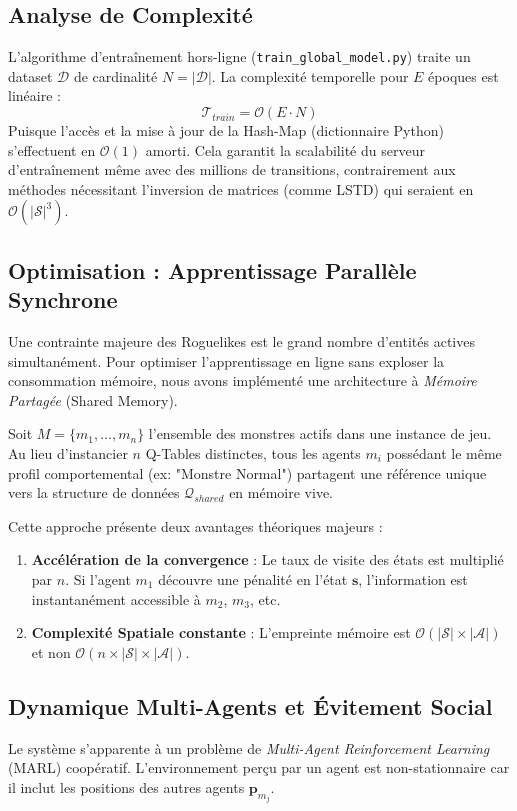 \documentclass[12pt,a4paper]{article}
\newcommand{\state}{\mathbf{s}}
\begin{document}
\subsection{Analyse de Complexité}
L'algorithme d'entraînement hors-ligne (\texttt{train\_global\_model.py}) traite un dataset $\mathcal{D}$ de cardinalité $N = |\mathcal{D}|$.
La complexité temporelle pour $E$ époques est linéaire :
\begin{equation}
    \mathcal{T}_{train} = \mathcal{O}(E \cdot N)
\end{equation}
Puisque l'accès et la mise à jour de la Hash-Map (dictionnaire Python) s'effectuent en $\mathcal{O}(1)$ amorti. Cela garantit la scalabilité du serveur d'entraînement même avec des millions de transitions, contrairement aux méthodes nécessitant l'inversion de matrices (comme LSTD) qui seraient en $\mathcal{O}(|\mathcal{S}|^3)$.

\subsection{Optimisation : Apprentissage Parallèle Synchrone}
Une contrainte majeure des Roguelikes est le grand nombre d'entités actives simultanément. Pour optimiser l'apprentissage en ligne sans exploser la consommation mémoire, nous avons implémenté une architecture à \textit{Mémoire Partagée} (Shared Memory).

Soit $M = \{m_1, \dots, m_n\}$ l'ensemble des monstres actifs dans une instance de jeu. Au lieu d'instancier $n$ Q-Tables distinctes, tous les agents $m_i$ possédant le même profil comportemental (ex: "Monstre Normal") partagent une référence unique vers la structure de données $\mathcal{Q}_{shared}$ en mémoire vive.

Cette approche présente deux avantages théoriques majeurs :
\begin{enumerate}
    \item \textbf{Accélération de la convergence} : Le taux de visite des états est multiplié par $n$. Si l'agent $m_1$ découvre une pénalité en l'état $\state$, l'information est instantanément accessible à $m_2$, $m_3$, etc.
    \item \textbf{Complexité Spatiale constante} : L'empreinte mémoire est $\mathcal{O}(|\mathcal{S}| \times |\mathcal{A}|)$ et non $\mathcal{O}(n \times |\mathcal{S}| \times |\mathcal{A}|)$.
\end{enumerate}

\subsection{Dynamique Multi-Agents et Évitement Social}
Le système s'apparente à un problème de \textit{Multi-Agent Reinforcement Learning} (MARL) coopératif. 
L'environnement perçu par un agent est non-stationnaire car il inclut les positions des autres agents $\mathbf{p}_{m_j}$.
\end{document}
